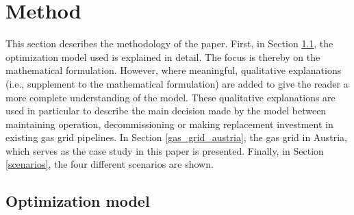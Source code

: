  \section{Method}\label{methodology}
This section describes the methodology of the paper. First, in Section \ref{model}, the optimization model used is explained in detail. The focus is thereby on the mathematical formulation. However, where meaningful, qualitative explanations (i.e., supplement to the mathematical formulation) are added to give the reader a more complete understanding of the model. These qualitative explanations are used in particular to describe the main decision made by the model between maintaining operation, decommissioning or making replacement investment in existing gas grid pipelines. In Section \ref{gas_grid_austria}, the gas grid in Austria, which serves as the case study in this paper is presented. Finally, in Section \ref{scenarios}, the four different scenarios are shown.

 \subsection{Optimization model}\label{model}
 
